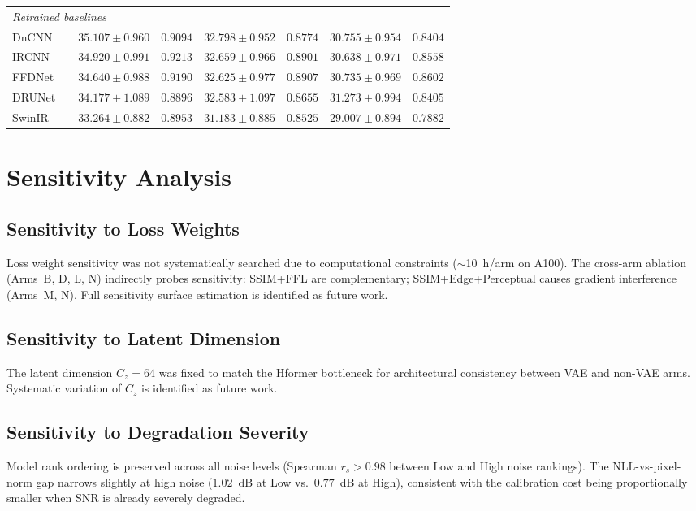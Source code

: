 \documentclass[12pt, a4paper, twoside, openright]{book}
\begin{document}
\begin{landscape}
\begin{longtable}{llcccccc}
\midrule
\multicolumn{8}{l}{\textit{Retrained baselines}} \\
DnCNN  & \cite{zhang_beyond_2017}  & $35.107 \pm 0.960$ & $0.9094$ & $32.798 \pm 0.952$ & $0.8774$ & $30.755 \pm 0.954$ & $0.8404$ \\
IRCNN  & \cite{zhang_learning_2017}& $34.920 \pm 0.991$ & $0.9213$ & $32.659 \pm 0.966$ & $0.8901$ & $30.638 \pm 0.971$ & $0.8558$ \\
FFDNet & \cite{zhang_ffdnet_2018}  & $34.640 \pm 0.988$ & $0.9190$ & $32.625 \pm 0.977$ & $0.8907$ & $30.735 \pm 0.969$ & $0.8602$ \\
DRUNet & \cite{zhang_drunet_2021}  & $34.177 \pm 1.089$ & $0.8896$ & $32.583 \pm 1.097$ & $0.8655$ & $31.273 \pm 0.994$ & $0.8405$ \\
SwinIR & \cite{liang_swinir_2021}  & $33.264 \pm 0.882$ & $0.8953$ & $31.183 \pm 0.885$ & $0.8525$ & $29.007 \pm 0.894$ & $0.7882$ \\
%
\end{longtable}
\end{landscape}

\section{Sensitivity Analysis}
\label{sec:results:sensitivity}

\subsection{Sensitivity to Loss Weights}
\label{sec:results:sensitivity:weights}
Loss weight sensitivity was not systematically searched due to computational constraints ($\sim$10~h/arm on A100). The cross-arm ablation (Arms~B, D, L, N) indirectly probes sensitivity: SSIM+FFL are complementary; SSIM+Edge+Perceptual causes gradient interference (Arms~M, N). Full sensitivity surface estimation is identified as future work.

\subsection{Sensitivity to Latent Dimension}
\label{sec:results:sensitivity:latent}
The latent dimension $C_z=64$ was fixed to match the Hformer bottleneck for architectural consistency between VAE and non-VAE arms. Systematic variation of $C_z$ is identified as future work.

\subsection{Sensitivity to Degradation Severity}
\label{sec:results:sensitivity:dose}
Model rank ordering is preserved across all noise levels (Spearman $r_s>0.98$ between Low and High noise rankings). The NLL-vs-pixel-norm gap narrows slightly at high noise ($1.02$~dB at Low vs.\ $0.77$~dB at High), consistent with the calibration cost being proportionally smaller when SNR is already severely degraded.
\end{document}
